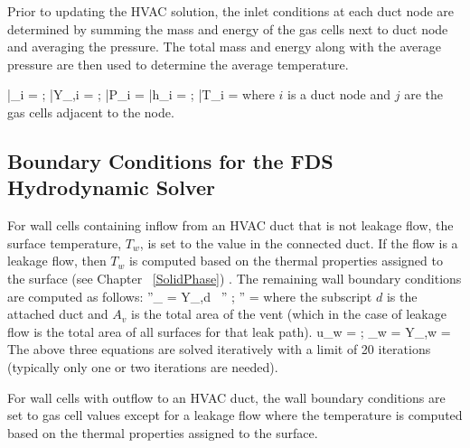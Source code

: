 Prior to updating the HVAC solution, the inlet conditions at each duct node are determined by summing the mass and energy of the gas cells next to duct node and averaging the pressure.  The total mass and energy along with the average pressure are then used to determine the average temperature.


\be \bar{\rho}_i =   \quad ; \quad
    \bar{Y}_{\alpha,i} =   \quad ; \quad
    \bar{P}_i =   \ee
\be \bar{h}_i =   \quad ; \quad
    \bar{T}_i =  \ee
where $i$ is a duct node and $j$ are the gas cells adjacent to the node.

\subsection{Boundary Conditions for the FDS Hydrodynamic Solver}

For wall cells containing inflow from an HVAC duct that is not leakage flow, the surface temperature, $T_w$, is set to the value in the connected duct.  If the flow is a leakage flow, then $T_w$ is computed based on the thermal properties assigned to the surface (see Chapter ~\ref{SolidPhase}) .  The remaining wall boundary conditions are computed as follows:
\be
   ''_{\alpha} = Y_{\alpha,d} \, '' \quad ; \quad {}'' = 
\ee
where the subscript $d$ is the attached duct and $A_v$ is the total area of the vent (which in the case of leakage flow is the total area of all surfaces for that leak path).
\be
   u_w =  \quad ; \quad \rho_w = 
\ee
\be
   Y_{\alpha,w} = 
\ee
The above three equations are solved iteratively with a limit of 20 iterations (typically only one or two iterations are needed).

For wall cells with outflow to an HVAC duct, the wall boundary conditions are set to gas cell values except for a leakage flow where the temperature is computed based on the thermal properties assigned to the surface.

